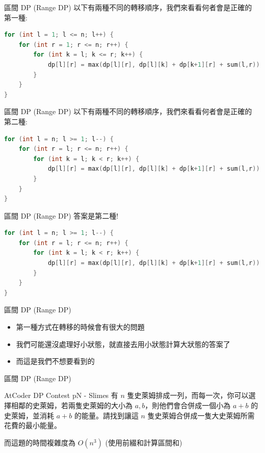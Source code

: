 \documentclass[aspectratio=169]{beamer}
\begin{document}
\begin{frame}[fragile]{區間 DP (Range DP)}
    以下有兩種不同的轉移順序，我們來看看何者會是正確的 \\
    \vspace{5mm}
    第一種: 
    \begin{lstlisting}[language=C++]
for (int l = 1; l <= n; l++) {
    for (int r = 1; r <= n; r++) {
        for (int k = l; k <= r; k++) {
            dp[l][r] = max(dp[l][r], dp[l][k] + dp[k+1][r] + sum(l,r));
        }
    }
}       
    \end{lstlisting} 
\end{frame}

\begin{frame}[fragile]{區間 DP (Range DP)}
    以下有兩種不同的轉移順序，我們來看看何者會是正確的 \\
    \vspace{5mm}
    第二種: 
    \begin{lstlisting}[language=C++]
for (int l = n; l >= 1; l--) {
    for (int r = l; r <= n; r++) {
        for (int k = l; k < r; k++) {
            dp[l][r] = max(dp[l][r], dp[l][k] + dp[k+1][r] + sum(l,r));
        }
    }
}       
    \end{lstlisting}
\end{frame}

\begin{frame}[fragile]{區間 DP (Range DP)}
    答案是第二種! \\
    \vspace{5mm}
    \begin{lstlisting}[language=C++]
for (int l = n; l >= 1; l--) {
    for (int r = l; r <= n; r++) {
        for (int k = l; k < r; k++) {
            dp[l][r] = max(dp[l][r], dp[l][k] + dp[k+1][r] + sum(l,r));
        }
    }
}       
    \end{lstlisting}
\end{frame}

\begin{frame}[fragile]{區間 DP (Range DP)}
    \begin{itemize}
        \item 第一種方式在轉移的時候會有很大的問題
        \item 我們可能還沒處理好小狀態，就直接去用小狀態計算大狀態的答案了
        \item 而這是我們不想要看到的
    \end{itemize}
\end{frame}

\begin{frame}[fragile]{區間 DP (Range DP)}
    \begin{block}{AtCoder DP Contest pN - Slimes}
        有 $n$ 隻史萊姆排成一列，而每一次，你可以選擇相鄰的史萊姆，若兩隻史萊姆的大小為 $a,b$，則他們會合併成一個小為 $a+b$ 的史萊姆，並消耗 $a+b$ 的能量。請找到讓這 $n$ 隻史萊姆合併成一隻大史萊姆所需花費的最小能量。
    \end{block} 
    而這題的時間複雜度為 $O(n^3)$ (使用前綴和計算區間和)
\end{frame}
\end{document}
